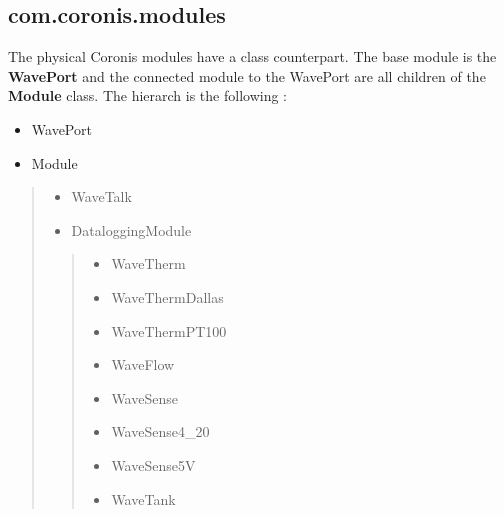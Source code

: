 \documentclass[a4paper,10pt,english]{sphinxmanual}
\begin{document}
\subsection{com.coronis.modules}
\label{technical_overview:com-coronis-modules}
The physical Coronis modules have a class counterpart. The base module is the \textbf{WavePort} and the connected module to the WavePort are all children of the \textbf{Module} class. The hierarch is the following :
\begin{itemize}
\item {} 
WavePort

\item {} 
Module

\end{itemize}
\begin{quote}
\begin{itemize}
\item {} 
WaveTalk

\item {} 
DataloggingModule

\end{itemize}
\begin{quote}
\begin{itemize}
\item {} 
WaveTherm

\end{itemize}
\begin{itemize}
\item {} 
WaveThermDallas

\item {} 
WaveThermPT100

\end{itemize}
\begin{itemize}
\item {} 
WaveFlow

\item {} 
WaveSense

\end{itemize}
\begin{itemize}
\item {} 
WaveSense4\_20

\item {} 
WaveSense5V

\item {} 
WaveTank

\end{itemize}
\end{quote}
\end{quote}
\end{document}
